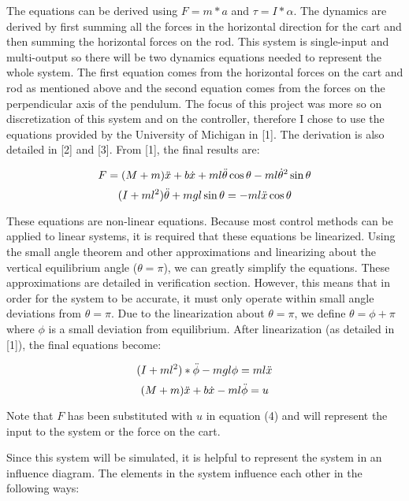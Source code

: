 \documentclass{article}
\begin{document}
The equations can be derived using $F=m*a$ and $\tau = I* \alpha$. The dynamics are derived by first summing all the forces in the horizontal direction for the cart and then summing the horizontal forces on the rod. This system is single-input and multi-output so there will be two dynamics equations needed to represent the whole system. The first equation comes from the horizontal forces on the cart and rod as mentioned above and the second equation comes from the forces on the perpendicular axis of the pendulum. The focus of this project was more so on discretization of this system and on the controller, therefore I chose to use the equations provided by the University of Michigan in [1]. The derivation is also detailed in [2] and [3]. From [1], the final results are: 

\begin{equation}
    F = (M + m)\Ddot{x} + b\Dot{x} + ml\Ddot{\theta}\cos{\theta} - ml\Dot{\theta}^2\sin{\theta}
\end{equation}
\begin{equation}
    (I + ml^2)\Ddot{\theta} + mgl\sin{\theta} = -ml\Ddot{x}\cos{\theta}
\end{equation}

These equations are non-linear equations. Because most control methods can be applied to linear systems, it is required that these equations be linearized. Using the small angle theorem and other approximations and linearizing about the vertical equilibrium angle ($\theta = \pi$), we can greatly simplify the equations. These approximations are detailed in verification section. However, this means that in order for the system to be accurate, it must only operate within small angle deviations from $\theta = \pi$. Due to the linearization about  $\theta = \pi$, we define $\theta = \phi + \pi$ where $\phi$ is a small deviation from equilibrium.  After linearization (as detailed in [1]), the final equations become: 

\begin{equation}
    (I+ml^2)*\Ddot{\phi} -  mgl\phi = ml\Ddot{x}
\end{equation}
\begin{equation}
    (M+m)\Ddot{x} + b\Dot{x} - ml\Ddot{\phi} = u
\end{equation}

Note that $F$ has been substituted with $u$ in equation (4) and will represent the input to the system or the force on the cart.

Since this system will be simulated, it is helpful to represent the system in an influence diagram. The elements in the system influence each other in the following ways:
\end{document}
